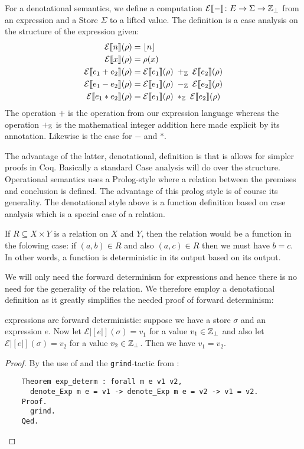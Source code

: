 For a denotational semantics, we define a computation
$\mathcal{E}|[-|] \colon E \to \Sigma \to \mathbb{Z}_{\perp}$ from an
expression and a Store $\Sigma$ to a lifted value. The definition is a
case analysis on the structure of the expression given:
\begin{align*}
  \mathcal{E}|[n|](\rho) & = \lfloor n \rfloor\\
  \mathcal{E}|[x|](\rho) & = \rho (x)\\
  \mathcal{E}|[e_1 + e_2|](\rho) & = \mathcal{E}|[e_1|](\rho) \;
  +_{\mathbb{Z}} \;
  \mathcal{E}|[e_2|](\rho)\\
  \mathcal{E}|[e_1 - e_2|](\rho) & = \mathcal{E}|[e_1|](\rho) \;
  -_{\mathbb{Z}} \;
  \mathcal{E}|[e_2|](\rho)\\
  \mathcal{E}|[e_1 * e_2|](\rho) & = \mathcal{E}|[e_1|](\rho) \;
  *_{\mathbb{Z}} \;
  \mathcal{E}|[e_2|](\rho)
\end{align*}
The operation $+$ is the operation from our expression language
whereas the operation $+_{\mathbb{Z}}$ is the mathematical integer addition
here made explicit by its annotation. Likewise is the case for $-$ and
$*$.

The advantage of the latter, denotational, definition is that is
allows for simpler proofs in Coq. Basically a standard Case analysis
will do over the structure. Operational semantics uses a Prolog-style
where a relation between the premises and conclusion is defined. The
advantage of this prolog style is of course its generality. The
denotational style above is a function definition based on case
analysis which is a special case of a relation.

If $R \subseteq X \times Y$ is a relation on $X$ and $Y$, then the
relation would be a function in the folowing case: if $(a, b) \in R$
and also $(a, c) \in R$ then we must have $b = c$. In other words, a
function is deterministic in its output based on its output.

We will only need the forward determinism for expressions and hence
there is no need for the generality of the relation. We therefore
employ a denotational definition as it greatly simplifies the needed
proof of forward determinism:

\begin{thm}
  \janusz{} expressions are forward deterministic: suppose we have a
  store $\sigma$ and an expression $e$. Now let
  $\mathcal{E}|[e|](\sigma) = v_1$ for a value $v_1 \in \mathbb{Z}_{\perp}$
  and also let $\mathcal{E}|[e|](\sigma) = v_2$ for a value $v_2 \in
  \mathbb{Z}_{\perp}$. Then we have $v_1 = v_2$.
\end{thm}
\begin{proof}
By the use of \coq{} and the \texttt{grind}-tactic from
\cite{chlipala+08:cpdt}:
\begin{verbatim}
    Theorem exp_determ : forall m e v1 v2,
      denote_Exp m e = v1 -> denote_Exp m e = v2 -> v1 = v2.
    Proof.
      grind.
    Qed.
\end{verbatim}
\end{proof}

